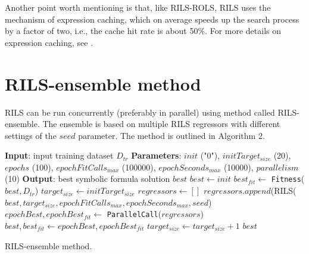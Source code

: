 \documentclass{article}
\begin{document}
Another point worth mentioning is that, like RILS-ROLS, RILS uses the mechanism of expression caching, which on average speeds up the search process by a factor of two, i.e., the cache hit rate is about 50\%. For more details on expression caching, see \cite{kartelj2023_rils_rols}.

\section{RILS-ensemble method}\label{sec:rils_ensemble}

RILS can be run concurrently (preferably in parallel) using method called RILS-ensemble. The ensemble is based on multiple RILS regressors with different settings of the $seed$ parameter. The method is outlined in Algorithm 2.

\begin{algorithm}
\footnotesize
\begin{algorithmic}[1]
    \Statex	  \textbf{Input}: input training dataset $D_{tr}$  
    \Statex \textbf{Parameters}: $init$ ("0"), $initTarget_{size}$ (20), $epochs$ (100), $epochFitCalls_{max}$ (100000), $epochSeconds_{max}$ (10000), $parallelism$ (10)
    \Statex \textbf{Output}: best symbolic formula solution $best$
    \State $best \gets init$ 
    \State $best_{fit} \gets$ \texttt{Fitness}($best, D_{tr}$)
    \State $target_{size} \gets initTarget_{size}$
        \State $regressors \gets []$
            \State $regressors.append$(RILS($best, target_{size},epochFitCalls_{max},epochSeconds_{max},seed$)
        \EndFor
        \State $epochBest, epochBest_{fit} \gets $ \texttt{ParallelCall}($regressors$)\label{line:parCall} 
            \State $best, best_{fit} \gets epochBest, epochBest_{fit}$
        \Else
            \State $target_{size} \gets target_{size} + 1$
        \EndIf
    \EndFor
    \State \Return $best$
\end{algorithmic}
\caption{RILS-ensemble method.}
\end{algorithm}
\end{document}
